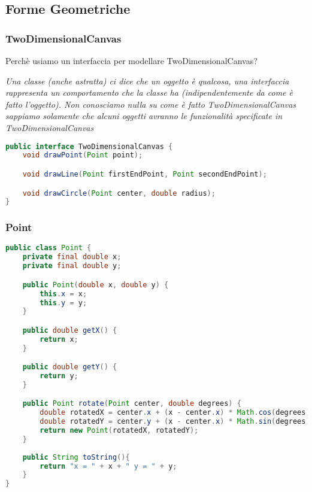 \documentclass{article}
\begin{document}
\subsection{Forme Geometriche}

\subsubsection{TwoDimensionalCanvas}
Perch\`e usiamo un interfaccia per modellare TwoDimensionalCanvas?

\emph{Una classe (anche astratta) ci dice che un oggetto \`e qualcosa, una interfaccia rappresenta un comportamento che la classe ha (indipendentemente da come \`e fatto l’oggetto). Non conosciamo nulla su come \`e fatto TwoDimensionalCanvas sappiamo solamente che alcuni oggetti avranno le funzionalit\`a specificate in TwoDimensionalCanvas}

\begin{lstlisting}[language=Java,escapechar=|]
public interface TwoDimensionalCanvas {
	void drawPoint(Point point);

	void drawLine(Point firstEndPoint, Point secondEndPoint);

	void drawCircle(Point center, double radius);
}
\end{lstlisting}


\subsubsection{Point}
\begin{lstlisting}[language=Java,escapechar=|]
public class Point {
	private final double x;
	private final double y;

	public Point(double x, double y) {
		this.x = x;
		this.y = y;
	}

	public double getX() {
		return x;
	}

	public double getY() {
		return y;
	}

	public Point rotate(Point center, double degrees) {
		double rotatedX = center.x + (x - center.x) * Math.cos(degrees) - (y - center.y) * Math.sin(degrees);
		double rotatedY = center.y + (x - center.x) * Math.sin(degrees) + (y - center.y) * Math.cos(degrees);
		return new Point(rotatedX, rotatedY);
	}
	
	public String toString(){
		return "x = " + x + " y = " + y;
	}
}
\end{lstlisting}
\end{document}
